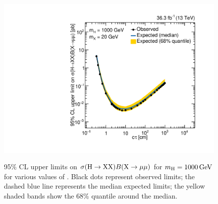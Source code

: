 \begin{figure}[htbp]
  \hspace*{-2em}
  \includegraphics[width=\DSquareWidth]{figures/displaced/Limits_2Mu_1000_20_HybridNew.pdf} \\
  \caption[95\% CL upper limits on $\sigma(\PHiggs\to \PLLP\PLLP)B(\PLLP\to\Pgm\Pgm)$ for $\mH = 1000\GeV$ for various values of \mX.]{95\% CL upper limits on $\sigma(\PHiggs\to \PLLP\PLLP)B(\PLLP\to\Pgm\Pgm)$ for $\mH = 1000\GeV$ for various values of \mX. Black dots represent observed limits; the dashed blue line represents the median expected limits; the yellow shaded bands show the 68\% quantile around the median.}
  \label{fig:dd:UpperLimits_mH_1000}
\end{figure}

